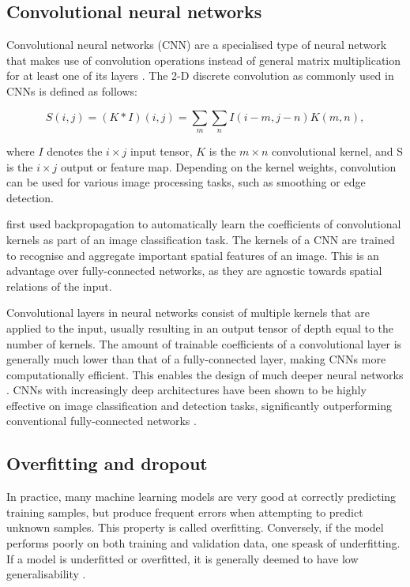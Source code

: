 \documentclass{l4proj}
\begin{document}
\subsection{Convolutional neural networks}

Convolutional neural networks (CNN) are a specialised type of neural network that makes use of convolution operations instead of general matrix multiplication for at least one of its layers \citep{goodfellow_deep_2016}. The 2-D discrete convolution as commonly used in CNNs is defined as follows:

\begin{equation}
  S(i, j) = (K \ast I) (i, j) = \sum_m \sum_n I(i-m, j-n) K(m, n),
\end{equation}

where $I$ denotes the $i \times j$ input tensor, $K$ is the $m \times n$ convolutional kernel, and S is the $i \times j$ output or feature map. Depending on the kernel weights, convolution can be used for various image processing tasks, such as smoothing or edge detection.

\citet{lecun_backpropagation_1989} first used backpropagation to automatically learn the coefficients of convolutional kernels as part of an image classification task. The kernels of a CNN are trained to recognise and aggregate important spatial features of an image. This is an advantage over fully-connected networks, as they are agnostic towards spatial relations of the input.

Convolutional layers in neural networks consist of multiple kernels that are applied to the input, usually resulting in an output tensor of depth equal to the number of kernels. The amount of trainable coefficients of a convolutional layer is generally much lower than that of a fully-connected layer, making CNNs more computationally efficient. This enables the design of much deeper neural networks \citep{goodfellow_deep_2016}. CNNs with increasingly deep architectures have been shown to be highly effective on image classification and detection tasks, significantly outperforming conventional fully-connected networks \citep{krizhevsky_imagenet_2012, szegedy_going_2015, he_deep_2016}.


\subsection{Overfitting and dropout}

In practice, many machine learning models are very good at correctly predicting training samples, but produce frequent errors when attempting to predict unknown samples. This property is called overfitting. Conversely, if the model performs poorly on both training and validation data, one speask of underfitting. If a model is underfitted or overfitted, it is generally deemed to have low generalisability \citep{burkov_hundred-page_2019}. 
\end{document}
